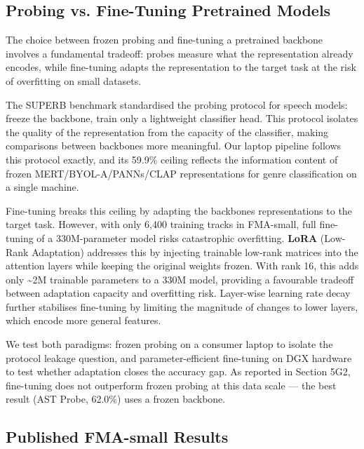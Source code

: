 \documentclass[conference]{IEEEtran}
\begin{document}
\subsection{Probing vs. Fine-Tuning Pretrained
Models}\label{f.-probing-vs.-fine-tuning-pretrained-models}

The choice between frozen probing and fine-tuning a pretrained backbone
involves a fundamental tradeoff: probes measure what the representation
already encodes, while fine-tuning adapts the representation to the
target task at the risk of overfitting on small datasets.

The SUPERB benchmark \citep{yang2021superb} standardised the probing
protocol for speech models: freeze the backbone, train only a
lightweight classifier head. This protocol isolates the quality of the
representation from the capacity of the classifier, making comparisons
between backbones more meaningful. Our laptop pipeline follows this
protocol exactly, and its 59.9\% ceiling reflects the information
content of frozen MERT/BYOL-A/PANNs/CLAP representations for genre
classification on a single machine.

Fine-tuning breaks this ceiling by adapting the
backbone\textquotesingle s representations to the target task. However,
with only 6,400 training tracks in FMA-small, full fine-tuning of a
330M-parameter model risks catastrophic overfitting. \textbf{LoRA}
(Low-Rank Adaptation) \citep{hu2021lora} addresses this by injecting
trainable low-rank matrices into the attention layers while keeping the
original weights frozen. With rank 16, this adds only \textasciitilde2M
trainable parameters to a 330M model, providing a favourable tradeoff
between adaptation capacity and overfitting risk. Layer-wise learning
rate decay further stabilises fine-tuning by limiting the magnitude of
changes to lower layers, which encode more general features.

We test both paradigms: frozen probing on a consumer laptop to isolate
the protocol leakage question, and parameter-efficient fine-tuning on
DGX hardware to test whether adaptation closes the accuracy gap. As
reported in Section 5G2, fine-tuning does not outperform frozen probing
at this data scale --- the best result (AST Probe, 62.0\%) uses a
frozen backbone.

\subsection{Published FMA-small
Results}\label{g.-published-fma-small-results}
\end{document}
